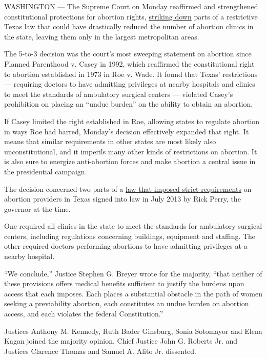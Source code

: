 WASHINGTON --- The Supreme Court on Monday reaffirmed and strengthened
constitutional protections for abortion rights,
\href{http://www.supremecourt.gov/opinions/15pdf/15-274_p8k0.pdf}{striking
down} parts of a restrictive Texas law that could have drastically
reduced the number of abortion clinics in the state, leaving them only
in the largest metropolitan areas.

The 5-to-3 decision was the court's most sweeping statement on abortion
since Planned Parenthood v. Casey in 1992, which reaffirmed the
constitutional right to abortion established in 1973 in Roe v. Wade. It
found that Texas' restrictions --- requiring doctors to have admitting
privileges at nearby hospitals and clinics to meet the standards of
ambulatory surgical centers --- violated Casey's prohibition on placing
an ``undue burden'' on the ability to obtain an abortion.

If Casey limited the right established in Roe, allowing states to
regulate abortion in ways Roe had barred, Monday's decision effectively
expanded that right. It means that similar requirements in other states
are most likely also unconstitutional, and it imperils many other kinds
of restrictions on abortion. It is also sure to energize anti-abortion
forces and make abortion a central issue in the presidential campaign.

The decision concerned two parts of a
\href{http://www.nytimes.com/2013/07/19/us/perry-signs-texas-abortion-restrictions-into-law.html}{law
that imposed strict requirements} on abortion providers in Texas signed
into law in July 2013 by Rick Perry, the governor at the time.

One required all clinics in the state to meet the standards for
ambulatory surgical centers, including regulations concerning buildings,
equipment and staffing. The other required doctors performing abortions
to have admitting privileges at a nearby hospital.

``We conclude,'' Justice Stephen G. Breyer wrote for the majority,
``that neither of these provisions offers medical benefits sufficient to
justify the burdens upon access that each imposes. Each places a
substantial obstacle in the path of women seeking a previability
abortion, each constitutes an undue burden on abortion access, and each
violates the federal Constitution.''

Justices Anthony M. Kennedy, Ruth Bader Ginsburg, Sonia Sotomayor and
Elena Kagan joined the majority opinion. Chief Justice John G. Roberts
Jr. and Justices Clarence Thomas and Samuel A. Alito Jr. dissented.

